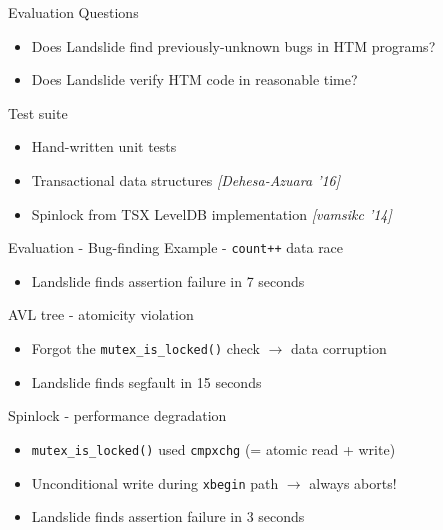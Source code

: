 \documentclass[xcolor=dvipsnames]{beamer}
\begin{document}
\begin{frame}{Evaluation}
	Questions
	\begin{itemize}
		\item Does Landslide find previously-unknown bugs in HTM programs?
		\item Does Landslide verify HTM code in reasonable time?
	\end{itemize}
	\linegap

	Test suite
	\begin{itemize}
		\item Hand-written unit tests
		\item Transactional data structures {\em [Dehesa-Azuara '16]}
		\item Spinlock from TSX LevelDB implementation {\em [vamsikc '14]}
	\end{itemize}
\end{frame}

\begin{frame}{Evaluation - Bug-finding}
	Example - {\tt count++} data race
	\begin{itemize}
		\item Landslide finds assertion failure in 7 seconds %
	\end{itemize}
	\linegap

	AVL tree - atomicity violation
	\begin{itemize}
		\item Forgot the {\tt mutex\_is\_locked()} check $\rightarrow$ data corruption
		\item Landslide finds segfault in 15 seconds %
	\end{itemize}
	\linegap

	Spinlock - performance degradation
	\begin{itemize}
		\item {\tt mutex\_is\_locked()} used {\tt cmpxchg} (= atomic read + write)
		\item Unconditional write during {\tt xbegin} path $\rightarrow$ always aborts!
		\item Landslide finds assertion failure in 3 seconds %
	\end{itemize}
\end{frame}
\end{document}
